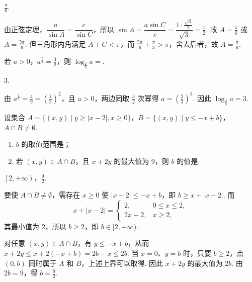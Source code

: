 \begin{answer}
\(\frac{\pi}{6}\).
\end{answer}

\begin{solution}
由正弦定理，\(\dfrac{a}{\sin A}=\dfrac{c}{\sin C}\)，所以
\(\sin A=\dfrac{a\sin C}{c}=\dfrac{1\cdot\frac{\sqrt3}{2}}{\sqrt3}=\frac12\). 故 \(A=\frac{\pi}{6}\) 或 \(A=\frac{5\pi}{6}\). 但三角形内角满足 \(A+C<\pi\)，而 \(\frac{5\pi}{6}+\frac{\pi}{3}>\pi\)，舍去后者，故 \(A=\frac{\pi}{6}\).
\end{solution}

\begin{problem}
若 \(a > 0\)，\(a^{\frac{2}{3}} = \frac{4}{9}\)，则 \(\log_{\frac{2}{3}} a =\)\fillinblank{}.
\end{problem}

\begin{answer}
\(3\).
\end{answer}

\begin{solution}
由 \(a^{\frac23}=\frac49=\left(\frac23\right)^{2}\)，且 \(a>0\)，两边同取 \(\frac32\) 次幂得 \(a=\left(\frac23\right)^{3}\). 因此 \(\log_{\frac23}a=3\).
\end{solution}

\begin{problem}
设集合 \(A = \{(x, y) \mid y \geqslant |x - 2|, x \geqslant 0\}\)，\(B = \{(x, y) \mid y \leqslant -x + b\}\)，\(A \cap B \neq \emptyset\).

\begin{enumerate}
\item \(b\) 的取值范围是\fillinblank{}；
\item 若 \((x, y) \in A \cap B\)，且 \(x + 2y\) 的最大值为 9，则 \(b\) 的值是\fillinblank{}.
\end{enumerate}
\end{problem}

\begin{answer}
\(\left[2,+\infty\right)\)，\(\frac{9}{2}\).
\end{answer}

\begin{solution}
要使 \(A\cap B\neq\emptyset\)，需存在 \(x\geqslant0\) 使
\(|x-2|\leqslant -x+b\)，即 \(b\geqslant x+|x-2|\). 而
\[
x+|x-2|=\begin{cases}
2,&0\leqslant x\leqslant2,\\
2x-2,&x\geqslant2,
\end{cases}
\]
其最小值为 \(2\)，所以 \(b\geqslant2\)，即 \(b\in[2,+\infty)\).

对任意 \((x,y)\in A\cap B\)，有 \(y\leqslant-x+b\)，从而
\(x+2y\leqslant x+2(-x+b)=2b-x\leqslant2b\). 当 \(x=0\)、\(y=b\) 时，只要 \(b\geqslant2\)，点 \((0,b)\) 同时属于 \(A\) 和 \(B\)，上述上界可以取得. 因此 \(x+2y\) 的最大值为 \(2b\). 由 \(2b=9\)，得 \(b=\frac92\).
\end{solution}

